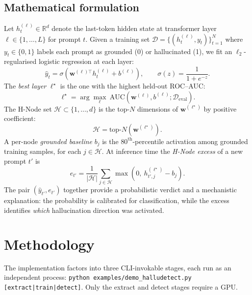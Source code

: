 \documentclass[11pt]{article}
\begin{document}
\subsection{Mathematical formulation}
Let $h_t^{(\ell)} \in \mathbb{R}^d$ denote the last-token hidden state at transformer layer
$\ell \in \{1,\dots,L\}$ for prompt $t$. Given a training set
$\mathcal{D} = \{(h_t^{(\ell)}, y_t)\}_{t=1}^{N}$ where $y_t \in \{0,1\}$ labels each prompt
as grounded (0) or hallucinated (1), we fit an $\ell_2$-regularised logistic regression at
each layer:
\begin{equation}
\hat{y}_t = \sigma\!\left(\mathbf{w}^{(\ell)\top} h_t^{(\ell)} + b^{(\ell)}\right),
\qquad \sigma(z) = \frac{1}{1+e^{-z}}.
\end{equation}
The \emph{best layer} $\ell^\star$ is the one with the highest held-out ROC--AUC:
\begin{equation}
\ell^\star = \arg\max_\ell \ \mathrm{AUC}\!\left(\mathbf{w}^{(\ell)}, b^{(\ell)};
\mathcal{D}_{\mathrm{eval}}\right).
\end{equation}
The H-Node set $\mathcal{H} \subset \{1,\dots,d\}$ is the top-$N$ dimensions of
$\mathbf{w}^{(\ell^\star)}$ by positive coefficient:
\begin{equation}
\mathcal{H} = \text{top-}N\!\left(\mathbf{w}^{(\ell^\star)}\right).
\end{equation}
A per-node \emph{grounded baseline} $b_j$ is the $80^{\text{th}}$-percentile activation among
grounded training samples, for each $j \in \mathcal{H}$. At inference time the \emph{H-Node
excess} of a new prompt $t'$ is
\begin{equation}
e_{t'} = \frac{1}{|\mathcal{H}|} \sum_{j \in \mathcal{H}}
\max\!\left(0,\ h_{t',j}^{(\ell^\star)} - b_j\right).
\end{equation}
The pair $(\hat{y}_{t'}, e_{t'})$ together provide a probabilistic verdict and a mechanistic
explanation: the probability is calibrated for classification, while the excess identifies
\emph{which} hallucination direction was activated.

\section{Methodology}

The implementation factors into three CLI-invokable stages, each run as an independent
process: \texttt{python examples/demo\_halludetect.py [extract|train|detect]}. Only the
extract and detect stages require a GPU.
\end{document}
